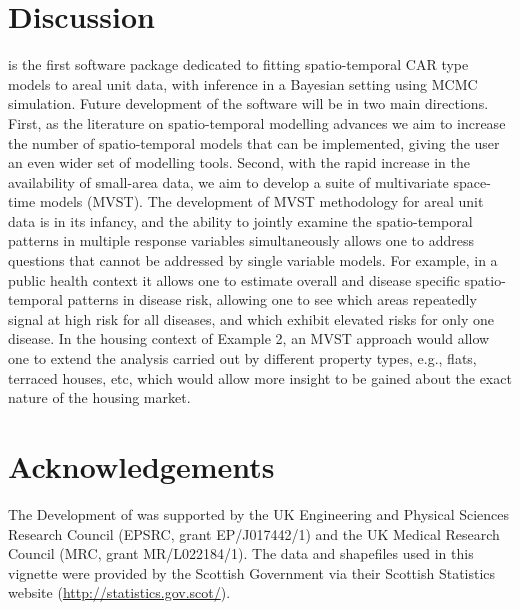 \documentclass[article, nojss]{jss}
\begin{document}
\section{Discussion}\label{section6}
 is the first software package dedicated to fitting spatio-temporal CAR type models to areal unit data, with inference in a Bayesian setting using MCMC simulation. Future development of the software will be in two main directions. First, as the literature on spatio-temporal modelling advances we aim to increase the number of spatio-temporal models that can be implemented, giving the user an even wider set of modelling tools. Second, with the rapid increase in the availability of small-area data, we aim to develop a suite of multivariate space-time models (MVST). The development of MVST methodology for areal unit data is in its infancy, and the ability to jointly examine the spatio-temporal patterns in multiple response variables simultaneously allows one to address questions that cannot be addressed by single variable models. For example, in a public health context it allows one to estimate overall and disease specific spatio-temporal  patterns in disease risk, allowing one to see which areas repeatedly signal at high risk for all diseases, and which exhibit elevated risks for only one disease. In the housing context of Example 2, an MVST approach would allow one to extend the analysis carried out by different property types, e.g., flats, terraced houses, etc, which would allow more insight to be gained about the exact nature of the housing market.  





\section{Acknowledgements}
The Development of  was supported by the UK Engineering and Physical Sciences Research Council (EPSRC, grant EP/J017442/1) and the UK Medical Research Council (MRC, grant MR/L022184/1). The data and shapefiles used in this vignette were provided by the Scottish Government via their Scottish Statistics website (\url{http://statistics.gov.scot/}).



\end{document}
